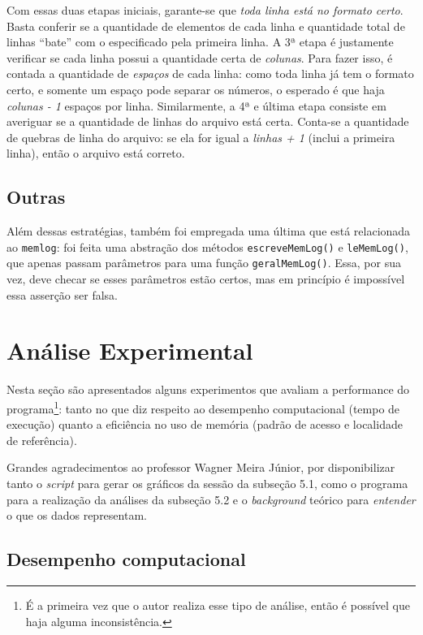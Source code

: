 \documentclass{article}
\def\code#1{\texttt{#1}}
\begin{document}
Com essas duas etapas iniciais, garante-se que \textit{toda linha está no formato certo}. Basta conferir se a quantidade de elementos de cada linha e quantidade total de linhas ``bate'' com o especificado pela primeira linha. A 3ª etapa é justamente verificar se cada linha possui a quantidade certa de \textit{colunas}. Para fazer isso, é contada a quantidade de \textit{espaços} de cada linha: como toda linha já tem o formato certo, e somente um espaço pode separar os números, o esperado é que haja \textit{colunas - 1} espaços por linha. Similarmente, a 4ª e última etapa consiste em averiguar se a quantidade de linhas do arquivo está certa. Conta-se a quantidade de quebras de linha do arquivo: se ela for igual a \textit{linhas + 1} (inclui a primeira linha), então o arquivo está correto.

\subsection{Outras}

Além dessas estratégias, também foi empregada uma última que está relacionada ao \code{memlog}: foi feita uma abstração dos métodos \code{escreveMemLog()} e \code{leMemLog()}, que apenas passam parâmetros para uma função \code{geralMemLog()}. Essa, por sua vez, deve checar se esses parâmetros estão certos, mas em princípio é impossível essa asserção ser falsa.

\section{Análise Experimental}

Nesta seção são apresentados alguns experimentos que avaliam a performance do programa\footnote{É a primeira vez que o autor realiza esse tipo de análise, então é possível que haja alguma inconsistência.}: tanto no que diz respeito ao desempenho computacional (tempo de execução) quanto a eficiência no uso de memória (padrão de acesso e localidade de referência). 

Grandes agradecimentos ao professor Wagner Meira Júnior, por disponibilizar tanto o \textit{script} para gerar os gráficos da sessão da subseção 5.1, como o programa para a realização da análises da subseção 5.2 e o \textit{background} teórico para \textit{entender} o que os dados representam.

\subsection{Desempenho computacional}
\end{document}
